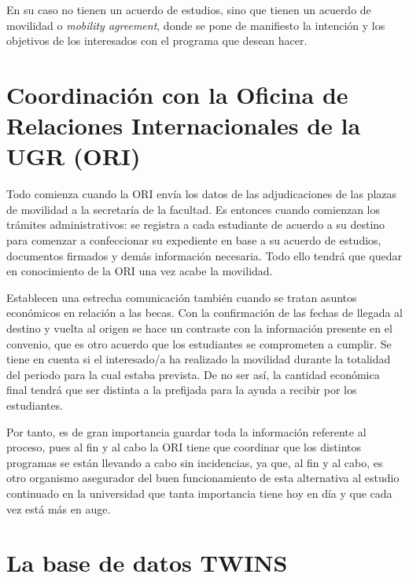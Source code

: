 En su caso no tienen un acuerdo de estudios, sino que tienen un acuerdo de movilidad o \textit{mobility agreement}, donde se pone de manifiesto la intención y los objetivos de los interesados con el programa que desean hacer.



\section{Coordinación con la Oficina de Relaciones Internacionales de la UGR (ORI)}

Todo comienza cuando la ORI envía los datos de las adjudicaciones de las plazas de movilidad a la secretaría de la facultad. Es entonces cuando comienzan los trámites administrativos: se registra a cada estudiante de acuerdo a su destino para comenzar a confeccionar su expediente en base a su acuerdo de estudios, documentos firmados y demás información necesaria. Todo ello tendrá que quedar en conocimiento de la ORI una vez acabe la movilidad.

Establecen una estrecha comunicación también cuando se tratan asuntos económicos en relación a las becas. Con la confirmación de las fechas de llegada al destino y vuelta al origen se hace un contraste con la información presente en el convenio, que es otro acuerdo que los estudiantes se comprometen a cumplir. Se tiene en cuenta si el interesado/a ha realizado la movilidad durante la totalidad del periodo para la cual estaba prevista. De no ser así, la cantidad económica final tendrá que ser distinta a la prefijada para la ayuda a recibir por los estudiantes.

Por tanto, es de gran importancia guardar toda la información referente al proceso, pues al fin y al cabo la ORI tiene que coordinar que los distintos programas se están llevando a cabo sin incidencias, ya que, al fin y al cabo, es otro organismo asegurador del buen funcionamiento de esta alternativa al estudio continuado en la universidad que tanta importancia tiene hoy en día y que cada vez está más en auge.

\section{La base de datos TWINS}


